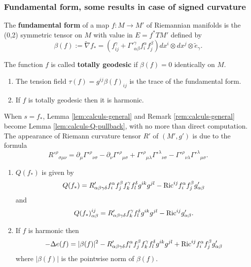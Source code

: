 \subsubsection{Fundamental form, some results in case of signed curvature}
\label{sec:org994013f}

\begin{definition}
The \textbf{fundamental form} of a map \(f: M \longrightarrow M'\) of Riemannian manifolds is
the (0,2) symmetric tensor on \(M\) with value in \(E=f^* TM'\) defined by
\[
 \beta(f):= \tilde \nabla f_* = \left(f^\gamma_{ij} + \Gamma'^\gamma_{\alpha\beta}
f^\alpha_i f^\beta_j\right) dx^i\otimes dx^j\otimes \tilde e_\gamma.
\]

The function \(f\) is called \textbf{totally geodesic} if \(\beta(f) = 0\) identically on \(M\).
\end{definition}

\begin{remark}
\begin{enumerate}
\item The tension field \(\tau(f) = g^{ij} \beta(f)_{ij}\) is the trace of the
fundamental form.
\item If \(f\) is totally geodesic then it is harmonic.
\end{enumerate}
\end{remark}

When \(s = f_*\), Lemma \ref{lem:calculs-general} and Remark \ref{rem:calculs-general}
become Lemma \ref{lem:calculs-Q-pullback}, with no more than direct computation. The appearance of Riemann curvature
tensor \(R'\) of \((M',g')\) is due to the formula
\[ R'^\rho{}_{\sigma\mu\nu} = \partial_\mu\Gamma'^\rho{}_{\nu\sigma} -
\partial_\nu\Gamma'^\rho{}_{\mu\sigma} +
\Gamma'^\rho{}_{\mu\lambda}\Gamma'^\lambda{}_{\nu\sigma} -
\Gamma'^\rho{}_{\nu\lambda}\Gamma'^\lambda{}_{\mu\sigma}. \]

\begin{lemma}
\label{lem:calculs-Q-pullback}
\begin{enumerate}
\item \(Q(f_*)\) is given by
\[
   Q(f_*) = R'_{\alpha\beta\gamma\delta} f^\alpha_i f^\beta_j f^\gamma_k f^\delta_l
   g^{ik}g^{jl} - {\rm Ric}^{ij}f_i^\alpha f^\beta_j g'_{\alpha\beta}
   \]
and
\[
   Q(f_*)_{\alpha\beta}^{ij} = R'_{\alpha\beta\gamma\delta}f^\gamma_k f^\delta_l g^{ik}g^{jl}
   -{\rm Ric}^{ij}g'_{\alpha\beta}.
   \]
\item If \(f\) is harmonic then 
\[
    -\Delta e(f) = |\beta(f)|^2 - R'_{\alpha\beta\gamma\delta} f^\alpha_i f^\beta_j f^\gamma_k f^\delta_l
   g^{ik}g^{jl} + {\rm Ric}^{ij}f_i^\alpha f^\beta_j g'_{\alpha\beta}
   \]
 where \(|\beta(f)|\) is the pointwise norm of \(\beta(f)\).
\end{enumerate}
\end{lemma}


